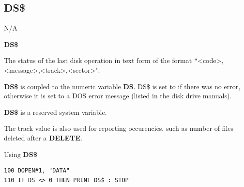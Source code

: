 
\newpage
\subsection{DS\$}
\begin{description}[leftmargin=2cm,style=nextline]
\item [Token:]    N/A

\item [Format:]   {\bf DS\$}

\item [Usage:]    The status of the last disk operation in text form of the format {\texttt"<code>,<message>,<track>,<sector>"}.

                  {\bf DS\$} is coupled to the numeric variable {\bf DS}. DS\$ is set to  if there was no error, otherwise it is set to a DOS error message (listed in the disk drive manuals).

\item [Remarks:]  {\bf DS\$} is a reserved system variable.

                  The track value is also used for reporting occurencies, such as number of files deleted after a {\bf DELETE}.

\item [Example:]  Using {\bf DS\$}

\begin{tcolorbox}[colback=black,coltext=white]
\verbatimfont{\codefont}
\begin{verbatim}
100 DOPEN#1, "DATA"
110 IF DS <> 0 THEN PRINT DS$ : STOP
\end{verbatim}
\end{tcolorbox}
\end{description}


\newpage
